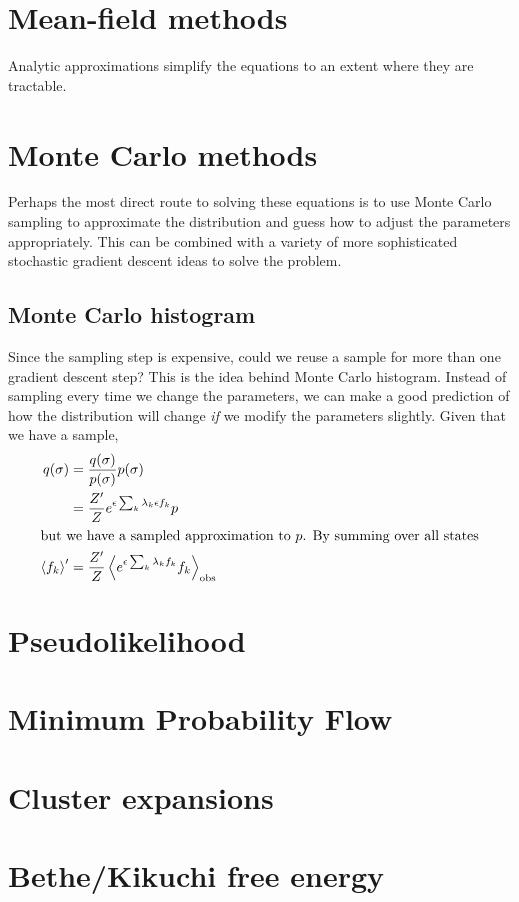 \documentclass[11pt]{amsart}
\newcommand{\br}[1]{\left<#1\right>}
\begin{document}
\section{Mean-field methods}
Analytic approximations simplify the equations to an extent where they are tractable.

\section{Monte Carlo methods}
Perhaps the most direct route to solving these equations is to use Monte Carlo sampling to approximate the distribution and guess how to adjust the parameters appropriately. This can be combined with a variety of more sophisticated stochastic gradient descent ideas to solve the problem.

\subsection{Monte Carlo histogram}
Since the sampling step is expensive, could we reuse a sample for more than one gradient descent step? This is the idea behind Monte Carlo histogram. Instead of sampling every time we change the parameters, we can make a good prediction of how the distribution will change \textit{if} we modify the parameters slightly. Given that we have a sample,
\begin{align}
	q(\sigma) &= \frac{q(\sigma)}{p(\sigma)}p(\sigma)\\
		&= \frac{Z'}{Z}e^{\epsilon\sum_k \lambda_k \epsilon f_k} p\\
\intertext{but we have a sampled approximation to $p$. By summing over all states}
	\br{f_k}' &= \frac{Z'}{Z} \br{e^{\epsilon\sum_k \lambda_k f_k} f_k}_{\rm obs}
\end{align}

\section{Pseudolikelihood}

\section{Minimum Probability Flow}

\section{Cluster expansions}

\section{Bethe/Kikuchi free energy}
\end{document}
